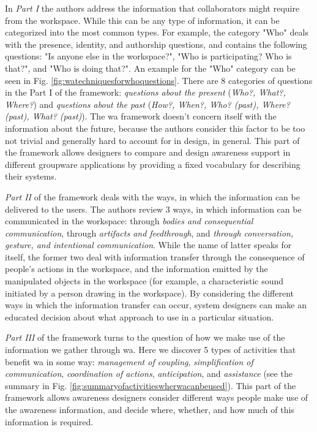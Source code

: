 In \textit{Part I} the authors address the information that collaborators might require from the workspace. While this can be any type of information, it can be categorized into the most common types. For example, the category "Who" deals with the presence, identity, and authorship questions, and contains the following questions: "Is anyone else in the workspace?", "Who is participating? Who is that?", and "Who is doing that?". An example for the "Who" category can be seen in Fig. \ref{fig:watechniquesforwhoquestions}. There are 8 categories of questions in the Part I of the framework: \textit{questions about the present} (\textit{Who?, What?, Where?}) and \textit{questions about the past} (\textit{How?, When?, Who? (past), Where? (past), What? (past)}). The \gls{wa} framework doesn't concern itself with the information about the future, because the authors consider this factor to be too not trivial and generally hard to account for in design, in general.
This part of the framework allows designers to compare and design awareness support in different groupware applications by providing a fixed vocabulary for describing their systems.

\textit{Part II} of the framework deals with the ways, in which the information can be delivered to the users. The authors review 3 ways, in which information can be communicated in the workspace: through \textit{bodies and consequential communication}, through \textit{artifacts and feedthrough}, and \textit{through conversation, gesture, and intentional communication}. While the name of latter speaks for itself, the former two deal with information transfer through the consequence of people's actions in the workspace, and the information emitted by the manipulated objects in the workspace (for example, a characteristic sound initiated by a person drawing in the workspace).
By considering the different ways in which the information transfer can occur, system designers can make an educated decision about what approach to use in a particular situation.

\textit{Part III} of the framework turns to the question of how we make use of the information we gather through \gls{wa}. Here we discover 5 types of activities that benefit \gls{wa} in some way: \textit{management of coupling}, \textit{simplification of communication}, \textit{coordination of actions}, \textit{anticipation}, and \textit{assistance} (see the summary in Fig. \ref{fig:summaryofactivitieswherwacanbeused}).
This part of the framework allows awareness designers consider different ways people make use of the awareness information, and decide where, whether, and how much of this information is required.


